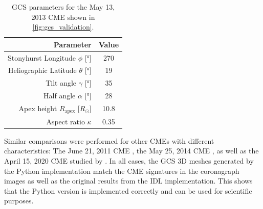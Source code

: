\begin{table}
	\centering
	\begin{tabular}{rS[table-format=3.2]}
		\toprule
		                                  {Parameter} & {Value} \\ \midrule
		   Stonyhurst Longitude $\phi$ [\si{\degree}] & 270     \\
		Heliographic Latitude $\theta$ [\si{\degree}] & 19      \\
		           Tilt angle $\gamma$ [\si{\degree}] & 35      \\
		           Half angle $\alpha$ [\si{\degree}] & 28      \\
		      Apex height $R_\text{apex}$ [$R_\odot$] & 10.8    \\
		                        Aspect ratio $\kappa$ & 0.35    \\ \bottomrule
	\end{tabular}
	\caption[\acs{GCS} parameters for \autoref{fig:gcs_validation}]{\ac{GCS} parameters for the May 13, 2013 \ac{CME} shown in \autoref{fig:gcs_validation}.}
	\label{tab:gcs_validation_params}
\end{table}

Similar comparisons were performed for other \acp{CME}  with different characteristics: The June 21, 2011 \ac{CME} \citep[originally reconstructed by][Table 1]{Heinemann-2019}, the May 25, 2014 \ac{CME} \citep[originally reconstructed by][Figure 5b]{Dumbovic2018-ForbMod}, as well as the April 15, 2020 \ac{CME} studied by \citet{Forstner-2021-SolO}. In all cases, the \ac{GCS} 3D meshes generated by the Python implementation match the \ac{CME} signatures in the coronagraph images as well as the original results from the \ac{IDL} implementation. This shows that the Python version is implemented correctly and can be used for scientific purposes.
